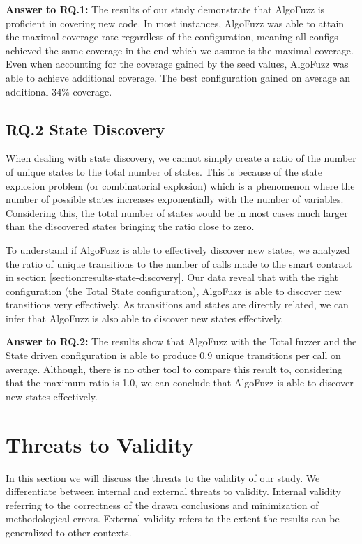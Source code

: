 \begin{mybox}
    \textbf{Answer to RQ.1:} The results of our study demonstrate that AlgoFuzz is proficient in covering new code.
    In most instances, AlgoFuzz was able to attain the maximal coverage rate regardless of the configuration, meaning all configs achieved the same coverage  in the end which we assume is the maximal coverage.
    Even when accounting for the coverage gained by the seed values, AlgoFuzz was able to achieve additional coverage. The best configuration gained on average an additional 34\% coverage.
\end{mybox}

\subsection*{RQ.2 State Discovery}
When dealing with state discovery, we cannot simply create a ratio of the number of unique states to the total number of states.
This is because of the state explosion problem (or combinatorial explosion) which is a phenomenon where the number of possible states increases exponentially with the number of variables.
Considering this, the total number of states would be in most cases much larger than the discovered states bringing the ratio close to zero.

To understand if AlgoFuzz is able to effectively discover new states, we analyzed the ratio of unique transitions to the number of calls made to the smart contract in section \ref{section:results-state-discovery}.
Our data reveal that with the right configuration (the Total State configuration), AlgoFuzz is able to discover new transitions very effectively.
As transitions and states are directly related, we can infer that AlgoFuzz is also able to discover new states effectively.

\begin{mybox}
    \textbf{Answer to RQ.2:} The results show that AlgoFuzz with the Total fuzzer and the State driven configuration is able to produce 0.9 unique transitions per call on average.
    Although, there is no other tool to compare this result to, considering that the maximum ratio is 1.0, we can conclude that AlgoFuzz is able to discover new states effectively.
\end{mybox}

\section{Threats to Validity}
In this section we will discuss the threats to the validity of our study.
We differentiate between internal and external threats to validity.
Internal validity referring to the correctness of the drawn conclusions and minimization of methodological errors.
External validity refers to the extent the results can be generalized to other contexts.

